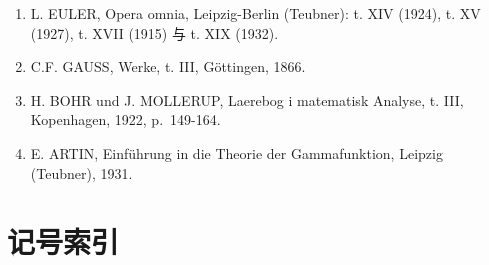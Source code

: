 \begin{enumerate}
\def\labelenumi{(\Roman{enumi})}
\item
L. EULER, Opera omnia, Leipzig-Berlin (Teubner): t. XIV (1924), t. XV (1927), t. XVII (1915) 与 t. XIX (1932).
\item
  C.F. GAUSS, Werke, t. III, Göttingen, 1866.
\item
  H. BOHR und J. MOLLERUP, Laerebog i matematisk Analyse, t. III, Kopenhagen, 1922, p.~149-164.
\item
  E. ARTIN, Einführung in die Theorie der Gammafunktion, Leipzig (Teubner), 1931.
\end{enumerate}

\backmatter
\chapter*{记号索引}
{}

